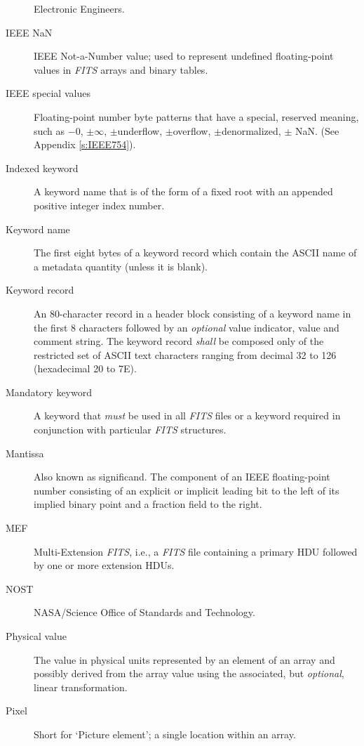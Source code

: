 \documentclass[11pt,makeidx]{book}     %
\begin{document}
\begin{description}
        Electronic Engineers.
\item[IEEE NaN] IEEE Not-a-Number 
        value; used to represent undefined floating-point values
	in {\em FITS\/} arrays and binary tables.
\item[IEEE special values] Floating-point number byte patterns that have
       a special, reserved meaning, such as
        $-0$, $\pm \infty$, $\pm$underflow, $\pm$overflow, $\pm$denormalized,
        $\pm$ NaN. (See Appendix \ref{s:IEEE754}).
\item[Indexed keyword] A keyword name that is 
       of the form of a fixed root with an appended positive integer index number.
\item[Keyword name] The first eight bytes of a keyword record which
contain the ASCII name of a metadata quantity (unless it is blank).
\item[Keyword record] An 80-character record in a header block
consisting of a keyword name in the first 8 characters followed by an {\em optional}
value indicator, value and comment string.  
The keyword record {\em shall} be composed only of the
restricted set of ASCII text characters ranging from decimal 32 to 126 
(hexadecimal 20 to 7E).
\item[Mandatory keyword] A keyword that {\em must} 
   be used in all {\em FITS\/} files or a keyword required 
   in conjunction with particular {\em FITS\/}
   structures.
\item[Mantissa] Also known as
                significand. The component of an IEEE floating-point
                number consisting of an explicit or implicit leading bit
                to the left of its implied binary point and a fraction
                field to the right.          
\item[MEF] Multi-Extension {\em FITS\/}, i.e., a {\em FITS} file containing a primary
    HDU followed by one or more extension HDUs.
\item[NOST] NASA/Science Office of Standards and 
       Technology.
\item[Physical value] The value in physical 
   units represented by an element
   of an array and possibly derived from 
   the array value
   using the associated, but {\em optional}, linear transformation.
\item[Pixel] Short for `Picture element';  a single location within an array.

\end{description}
\end{document}
